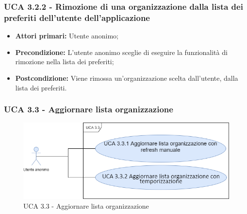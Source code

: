\subsubsection{UCA 3.2.2 - Rimozione di una organizzazione dalla lista dei preferiti dell'utente dell'applicazione}%
\begin{itemize}
	\item \textbf{Attori primari:} Utente anonimo;
	\item \textbf{Precondizione:}  L'utente anonimo sceglie di eseguire la funzionalità di rimozione nella lista dei preferiti;
	\item \textbf{Postcondizione:} Viene rimossa un'organizzazione scelta dall'utente, dalla lista dei preferiti.
\end{itemize}



\subsubsection{UCA 3.3 - Aggiornare lista organizzazione}%

\begin{figure}[h]
	\centering
	\includegraphics[scale=0.5]{sezioni/UseCase/Immagini/UCA3.3.png}
	\caption{UCA 3.3 - Aggiornare lista organizzazione}
\end{figure}

